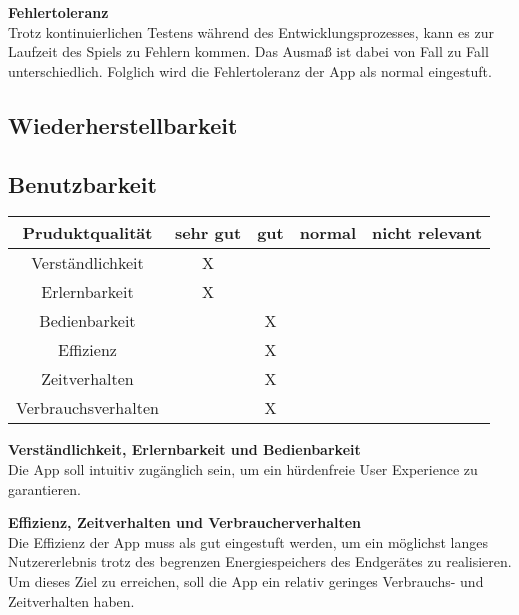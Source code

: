 \documentclass[parskip=full]{scrartcl}
\begin{document}
\textbf{Fehlertoleranz}\\
Trotz kontinuierlichen Testens während des Entwicklungsprozesses, kann es zur Laufzeit des Spiels zu Fehlern kommen.
Das Ausmaß ist dabei von Fall zu Fall unterschiedlich. 
Folglich wird die Fehlertoleranz der App als normal eingestuft.

\subsection{Wiederherstellbarkeit}


\subsection{Benutzbarkeit}
\begin{tabular}{| c | c | c | c | c |}
    \hline
    \textbf{Pruduktqualität} & \textbf{sehr gut} & \textbf{gut} & \textbf{normal} & \textbf{nicht relevant} \\ \hline
    Verständlichkeit & X &  &  & \\ \hline
    Erlernbarkeit & X &  &  & \\ \hline
    Bedienbarkeit &  & X &  &  \\ \hline
    Effizienz &  & X &  &  \\ \hline
    Zeitverhalten &  & X &  &  \\ \hline
    Verbrauchsverhalten &  & X &  &  \\ \hline
\end{tabular}

\textbf{Verständlichkeit, Erlernbarkeit und Bedienbarkeit}\\
Die App soll intuitiv zugänglich sein, um ein hürdenfreie User Experience zu garantieren.

\textbf{Effizienz, Zeitverhalten und Verbraucherverhalten}\\
Die Effizienz der App muss als gut eingestuft werden, um ein möglichst langes Nutzererlebnis trotz des begrenzen Energiespeichers des Endgerätes zu realisieren.
Um dieses Ziel zu erreichen, soll die App ein relativ geringes Verbrauchs- und Zeitverhalten haben.
\end{document}
